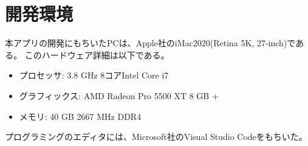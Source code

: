 \section{開発環境}
本アプリの開発にもちいたPCは、Apple社のiMac2020(Retina 5K, 27-inch)である。
このハードウェア詳細は以下である。

\begin{itemize}
  \item {プロセッサ: 3.8 GHz 8コアIntel Core i7}
  \item {グラフィックス: AMD Radeon Pro 5500 XT 8 GB + }
  \item {メモリ: 40 GB 2667 MHz DDR4}  
\end{itemize}
プログラミングのエディタには、Microsoft社のVisual Studio Code\cite{vscode}をもちいた。
